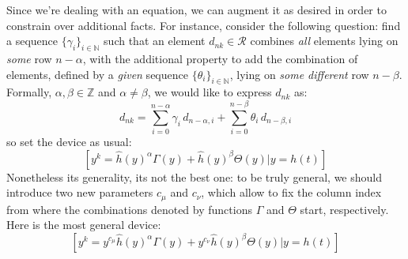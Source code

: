 Since we're dealing with an equation, we can augment it as desired in order to
constrain over additional facts. For instance, consider the following question:
find a sequence $\lbrace \gamma_{i} \rbrace_{i\in\mathbb{N}}$ such that 
an element $d_{nk}\in\mathcal{R}$ combines \emph{all} elements lying on 
\emph{some} row $n-\alpha$, with the additional property to add the combination of 
elements, defined by a \emph{given} sequence $\lbrace \theta_{i} \rbrace_{i\in\mathbb{N}}$, 
lying on \emph{some different} row $n-\beta$. Formally, $\alpha,\beta\in\mathbb{Z}$ 
and $\alpha \not=\beta$, we would like to express $d_{nk}$ as:
\begin{displaymath}
    d_{nk} = \sum_{i=0}^{n-\alpha}{\gamma_{i}\,d_{n-\alpha,i}} + 
        \sum_{i=0}^{n-\beta}{\theta_{i}\,d_{n-\beta,i}}
\end{displaymath}
so set the device as usual:
\begin{displaymath}
    \left[y^{k} = \hat{h}(y)^{\alpha} \Gamma(y) + \hat{h}(y)^{\beta} \Theta(y) \big| y = h(t) \right]
\end{displaymath}
Nonetheless its generality, its not the best one: to be truly general,
we should introduce two new parameters $c_\mu$ and $c_\nu$, which allow
to fix the column index from where the combinations denoted by functions
$\Gamma$ and $\Theta$ start, respectively. Here is the most general device:
\begin{displaymath}
    \left[y^{k} = y^{c_\mu}\hat{h}(y)^{\alpha} \Gamma(y) + 
        y^{c_\nu}\hat{h}(y)^{\beta} \Theta(y) \big| y = h(t) \right]
\end{displaymath}
\\\\
